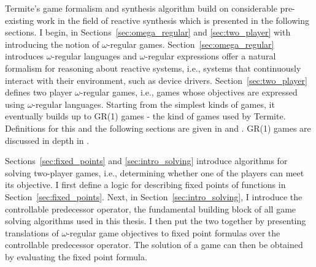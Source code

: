 Termite's game formalism and synthesis algorithm build on considerable pre-existing work in the field of reactive synthesis which is presented in the following sections. I begin, in Sections~\ref{sec:omega_regular} and \ref{sec:two_player} with introducing the notion of $\omega$-regular games.  Section~\ref{sec:omega_regular} introduces $\omega$-regular languages and $\omega$-regular expressions offer a natural formalism for reasoning about reactive systems, i.e., systems that continuously interact with their environment, such as device drivers.  
Section~\ref{sec:two_player} defines two player $\omega$-regular games, i.e., games whose objectives are expressed using $\omega$-regular languages.  Starting from the simplest kinds of games, it eventually builds up to GR(1) games - the kind of games used by Termite. Definitions for this and the following sections are given in \cite{Gradel} and \cite{Thomas_95}. GR(1) games are discussed in depth in \cite{Piterman_PS_06}.

Sections~\ref{sec:fixed_points} and \ref{sec:intro_solving} introduce algorithms for solving two-player games, i.e., determining whether one of the players can meet its objective.  I first define a logic for describing fixed points of functions in Section~\ref{sec:fixed_points}.  Next, in Section~\ref{sec:intro_solving}, I introduce the controllable predecessor operator, the fundamental building block of all game solving algorithms used in this thesis.  I then put the two together by presenting translations of $\omega$-regular game objectives to fixed point formulas over the controllable predecessor operator. The solution of a game can then be obtained by evaluating the fixed point formula.


%

